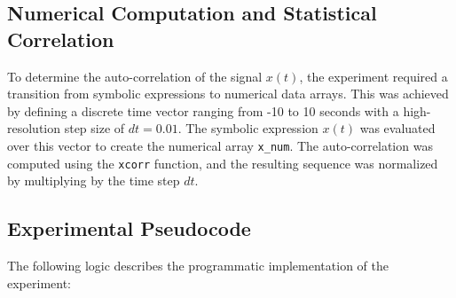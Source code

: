 \begin{table}[htbp]
\centering
\caption{Mathematical Expressions for Filter Impulse Responses}
\end{table}

\subsection{Numerical Computation and Statistical Correlation}
To determine the auto-correlation of the signal $x(t)$, the experiment required a transition from symbolic expressions to numerical data arrays. This was achieved by defining a discrete time vector ranging from -10 to 10 seconds with a high-resolution step size of $dt = 0.01$. The symbolic expression $x(t)$ was evaluated over this vector to create the numerical array \texttt{x\_num}. The auto-correlation was computed using the \texttt{xcorr} function, and the resulting sequence was normalized by multiplying by the time step $dt$. 

\subsection{Experimental Pseudocode}
The following logic describes the programmatic implementation of the experiment:

